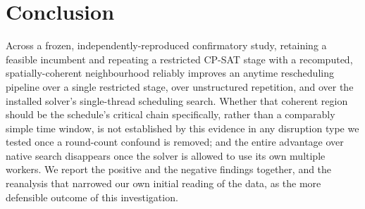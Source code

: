 \documentclass[letterpaper]{article} %
\begin{document}
\section{Conclusion}

Across a frozen, independently-reproduced confirmatory study, retaining a feasible incumbent and repeating a restricted CP-SAT stage with a recomputed, spatially-coherent neighbourhood reliably improves an anytime rescheduling pipeline over a single restricted stage, over unstructured repetition, and over the installed solver's single-thread scheduling search. Whether that coherent region should be the schedule's critical chain specifically, rather than a comparably simple time window, is not established by this evidence in any disruption type we tested once a round-count confound is removed; and the entire advantage over native search disappears once the solver is allowed to use its own multiple workers. We report the positive and the negative findings together, and the reanalysis that narrowed our own initial reading of the data, as the more defensible outcome of this investigation.


\end{document}
